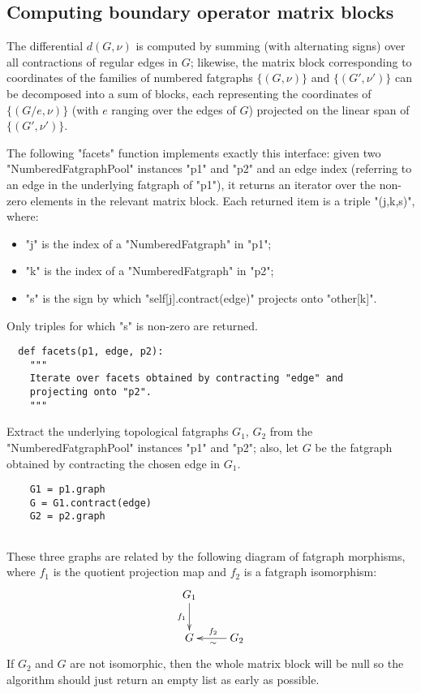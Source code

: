 \subsection{Computing boundary operator matrix blocks}
\label{sec:blocks}

The differential $d(G,\nu)$ is computed by summing (with alternating
signs) over all contractions of regular edges in $G$; likewise, the
matrix block corresponding to coordinates of the families of numbered
fatgraphs $\{(G,\nu)\}$ and $\{(G',\nu')\}$ can be decomposed into a
sum of blocks, each representing the coordinates of $\{(G/e,\nu)\}$
(with $e$ ranging over the edges of $G$) projected on the linear span
of $\{(G',\nu')\}$.

The following "facets" function implements exactly this interface:
given two "NumberedFatgraphPool" instances "p1" and "p2" and an edge
index (referring to an edge in the underlying fatgraph of "p1"), it
returns an iterator over the non-zero elements in the relevant matrix
block. 
Each returned item is a triple "(j,k,s)", where:
\begin{itemize}
\item "j" is the index of a "NumberedFatgraph" in "p1";
\item "k" is the index of a "NumberedFatgraph" in "p2";
\item "s" is the sign by which "self[j].contract(edge)" projects onto
  "other[k]".
\end{itemize}
Only triples for which "s" is non-zero are returned.
\begin{lstlisting}
  def facets(p1, edge, p2):
    """
    Iterate over facets obtained by contracting "edge" and
    projecting onto "p2".
    """

\end{lstlisting}

Extract the underlying topological fatgraphs $G_1$, $G_2$ from the
"NumberedFatgraphPool" instances "p1" and "p2"; also, let $G$ be the
fatgraph obtained by contracting the chosen edge in $G_1$.
\begin{lstlisting}
    G1 = p1.graph
    G = G1.contract(edge)
    G2 = p2.graph
    
\end{lstlisting}
These three graphs are related by the following diagram of fatgraph
morphisms, where $f_1$ is the quotient projection map and $f_2$ is a
fatgraph isomorphism:
\begin{equation*}
  \xymatrix{
    G_1 & 
    \\
    G   &  G_2
    \ar_{f_1} "1,1";"2,1"
    \ar_{f_2}^{\sim} "2,2";"2,1"
  }
\end{equation*}
If $G_2$ and $G$ are not isomorphic, then the whole matrix block will
be null so the algorithm should just return an empty list as early as
possible. 

